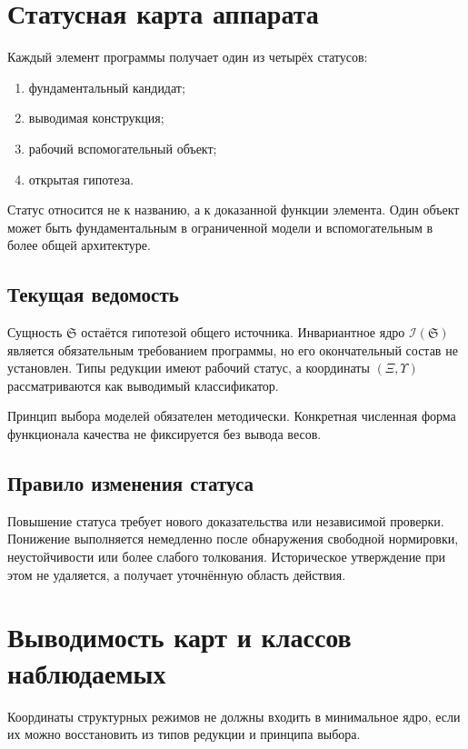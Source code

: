 \chapter{Статусная карта аппарата}

Каждый элемент программы получает один из четырёх статусов:
\begin{enumerate}
 \item фундаментальный кандидат;
 \item выводимая конструкция;
 \item рабочий вспомогательный объект;
 \item открытая гипотеза.
\end{enumerate}

Статус относится не к названию, а к доказанной функции элемента. Один объект
может быть фундаментальным в ограниченной модели и вспомогательным в более
общей архитектуре.

\section{Текущая ведомость}

Сущность $\mathfrak S$ остаётся гипотезой общего источника. Инвариантное ядро
$\mathcal I(\mathfrak S)$ является обязательным требованием программы, но его
окончательный состав не установлен. Типы редукции имеют рабочий статус, а
координаты $(\Xi,\Upsilon)$ рассматриваются как выводимый классификатор.

Принцип выбора моделей обязателен методически. Конкретная численная форма
функционала качества не фиксируется без вывода весов.

\section{Правило изменения статуса}

Повышение статуса требует нового доказательства или независимой проверки.
Понижение выполняется немедленно после обнаружения свободной нормировки,
неустойчивости или более слабого толкования. Историческое утверждение при этом
не удаляется, а получает уточнённую область действия.

\chapter{Выводимость карт и классов наблюдаемых}

Координаты структурных режимов не должны входить в минимальное ядро, если их
можно восстановить из типов редукции и принципа выбора.

